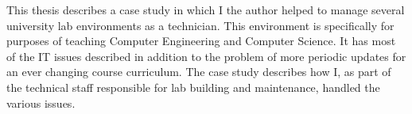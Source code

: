 
This thesis describes a case study in which I the author helped to manage several university lab environments as a technician.  This environment is specifically for purposes of teaching Computer Engineering and Computer Science.  It has most of the IT issues described in addition to the problem of more periodic updates for an ever changing course curriculum.  The case study describes how I, as part of the technical staff responsible for lab building and maintenance, handled the various issues.
